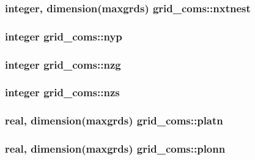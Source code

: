 \subsubsection[{nxtnest}]{\setlength{\rightskip}{0pt plus 5cm}integer, dimension(maxgrds) grid\+\_\+coms\+::nxtnest}\label{namespacegrid__coms_a3a74d4b8ff65bb4d8f8eb2f22a91c68d}
\hypertarget{namespacegrid__coms_af5bde1fabbca5ebe3e44f565781fc950}{}
\subsubsection[{nyp}]{\setlength{\rightskip}{0pt plus 5cm}integer grid\+\_\+coms\+::nyp}\label{namespacegrid__coms_af5bde1fabbca5ebe3e44f565781fc950}
\hypertarget{namespacegrid__coms_a142d9d74c03f8fa05eda4634bfbe0b83}{}
\subsubsection[{nzg}]{\setlength{\rightskip}{0pt plus 5cm}integer grid\+\_\+coms\+::nzg}\label{namespacegrid__coms_a142d9d74c03f8fa05eda4634bfbe0b83}
\hypertarget{namespacegrid__coms_a760d4b670328e4c3a0a7accfdac64c19}{}
\subsubsection[{nzs}]{\setlength{\rightskip}{0pt plus 5cm}integer grid\+\_\+coms\+::nzs}\label{namespacegrid__coms_a760d4b670328e4c3a0a7accfdac64c19}
\hypertarget{namespacegrid__coms_adeea6f966fb6ad97de70d6d4f27e273c}{}
\subsubsection[{platn}]{\setlength{\rightskip}{0pt plus 5cm}real, dimension(maxgrds) grid\+\_\+coms\+::platn}\label{namespacegrid__coms_adeea6f966fb6ad97de70d6d4f27e273c}
\hypertarget{namespacegrid__coms_aeb6e6ef8eced0c1e67af7b80cead352c}{}
\subsubsection[{plonn}]{\setlength{\rightskip}{0pt plus 5cm}real, dimension(maxgrds) grid\+\_\+coms\+::plonn}\label{namespacegrid__coms_aeb6e6ef8eced0c1e67af7b80cead352c}
\hypertarget{namespacegrid__coms_a332ff2495f60062e9fa9f90035dc8cd3}{}
